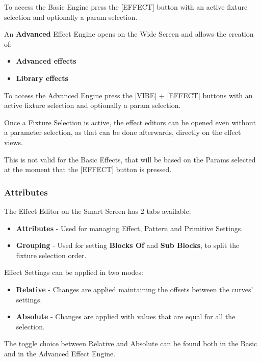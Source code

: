 \documentclass[
]{article}
\begin{document}
To access the Basic Engine press the {[}EFFECT{]} button with an active fixture selection and optionally a param selection.

An \textbf{Advanced} Effect Engine opens on the Wide Screen and allows the creation of:

\begin{itemize}
\item
  \textbf{Advanced effects}
\item
  \textbf{Library effects}
\end{itemize}

To access the Advanced Engine press the {[}VIBE{]} + {[}EFFECT{]} buttons with an active fixture selection and optionally a param selection.

Once a Fixture Selection is active, the effect editors can be opened even without a parameter selection, as that can be done afterwards, directly on the effect views.

This is not valid for the Basic Effects, that will be based on the Params selected at the moment that the {[}EFFECT{]} button is pressed.

\hypertarget{attributes}{%
\subsubsection{Attributes}\label{attributes}}

The Effect Editor on the Smart Screen has 2 tabs available:

\begin{itemize}
\item
  \textbf{Attributes} - Used for managing Effect, Pattern and Primitive Settings.
\item
  \textbf{Grouping} - Used for setting \textbf{Blocks Of} and \textbf{Sub Blocks}, to split the fixture selection order.
\end{itemize}

Effect Settings can be applied in two modes:

\begin{itemize}
\item
  \textbf{Relative} - Changes are applied maintaining the offsets between the curves' settings.
\item
  \textbf{Absolute} - Changes are applied with values that are equal for all the selection.
\end{itemize}

The toggle choice between Relative and Absolute can be found both in the Basic and in the Advanced Effect Engine.
\end{document}
